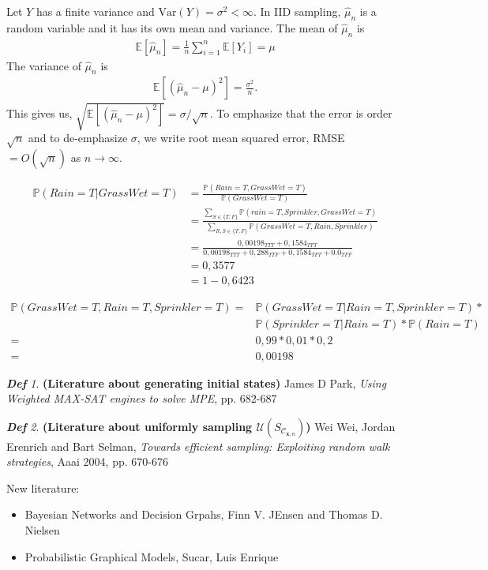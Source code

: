 \documentclass{amsart}
\newcommand{\bfx}{{\mathbf{x}}}
\theoremstyle{plain}
\theoremstyle{remark}
\newtheorem*{definition*}{\textbf{\em Def}}
\theoremstyle{plain}
\renewcommand{\P}{{\mathbb P}}
\newcommand{\C}{{\mathcal C}}
\newcommand{\E}{{\mathbb E}}
\newcommand{\U}{{\mathcal{U}}}
\newcommand{\Var}{{\text{Var}}}
\newcommand{\vs}{\vspace{0.75pc}}
\begin{document}
Let $Y$ has a finite variance and $\Var(Y)=\sigma^2 < \infty$. In IID sampling, $\hat{\mu}_n$ is a random variable and it has its own mean and variance. The mean of $\hat{\mu}_n$ is
\begin{align*}
\E[\hat{\mu}_n] = \frac{1}{n} \sum_{i=1}^n \E[Y_i] = \mu
\end{align*}
The variance of $\hat{\mu}_n$ is
\begin{align*}
\E[(\hat{\mu}_n - \mu)^2 ] = \frac{\sigma^2}{n}.
\end{align*}
This gives us, $\sqrt{\E[(\hat{\mu}_n - \mu)^2 ]} = \sigma / \sqrt{n}$. To emphasize that the error is order $\sqrt{n}$ and to de-emphasize $\sigma$, we write root mean squared error, RMSE $ = O(\sqrt{n})$ as $n \to \infty$.

\vspace{3pc}

 
\begin{align*}
\P(Rain = T | GrassWet = T) &= \frac{\P(Rain = T, GrassWet = T)}{\P(GrassWet = T)} \\
&=  \frac{\sum_{S \in \{T,F\}} \P(rain = T, Sprinkler, GrassWet = T)}{\sum_{R,S \in \{T,F\}} \P(GrassWet = T, Rain, Sprinkler)} \\
&= \frac{0,00198_{TTT} + 0,1584_{TFT}}{0,00198_{TTT} + 0,288_{TTF} + 0,1584_{TFT} + 0.0_{TFF}} \\
&= 0,3577 \\
&= 1 - 0,6423
\end{align*}\vs

\begin{align*}
\P(GrassWet = T, Rain = T, Sprinkler = T) = &\P(GrassWet = T | Rain = T, Sprinkler = T) * \\ 
&\P(Sprinkler = T | Rain = T) * \P(Rain = T) \\
= & 0,99 * 0,01 * 0,2 \\
= & 0,00198
\end{align*} \vs

\newpage



\begin{definition*}\textbf{ (Literature about generating initial states) } \newline
[18] James D Park, \textit{Using Weighted MAX-SAT engines to solve MPE}, pp. 682-687
\end{definition*}\vs 

\begin{definition*}\textbf{ (Literature about uniformly sampling $\U(S_{\C_{\bfx,n}})
$) } \newline
[28] Wei Wei, Jordan Erenrich and Bart Selman, \textit{Towards efficient sampling: Exploiting random walk strategies}, Aaai 2004, pp. 670-676
\end{definition*}\vs 

New literature:
\begin{itemize}
\item Bayesian Networks and Decision Grpahs, Finn V. JEnsen and Thomas D. Nielsen
\item Probabilistic Graphical Models, Sucar, Luis Enrique
\end{itemize}
\end{document}
